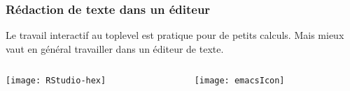 \documentclass[10pt]{beamer}
\begin{document}
\begin{frame}
  \frametitle{Rédaction de texte dans un éditeur}
  Le travail interactif au \alert{toplevel} est pratique pour de petits calculs.
  Mais mieux vaut en général travailler dans un \alert{éditeur de texte}.
\begin{columns}[t]
\begin{column}{0.49\textwidth}
    \begin{center}
      \texttt{[image: RStudio-hex]}
    \end{center}
\end{column}
\begin{column}{0.49\textwidth}
    \begin{center}
      \texttt{[image: emacsIcon]}
    \end{center}
\end{column}
\end{columns}
\end{frame}



 \questionSlide

 \appendix
 \backupSlides









\end{document}
